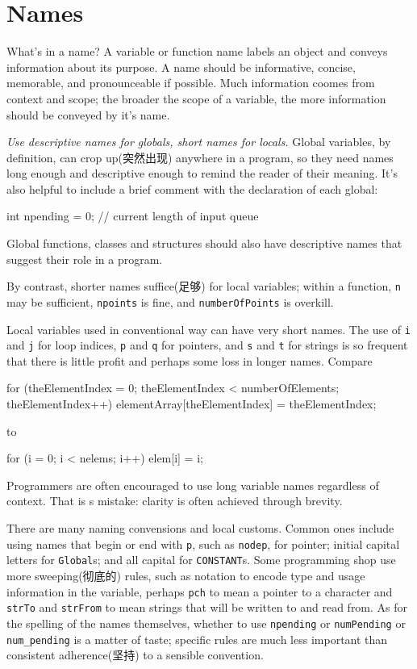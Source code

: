 \section{Names}
\label{sec:names}
What's in a name? A variable or function name labels an object and conveys
information about its purpose. A name should be informative, concise,
memorable, and pronounceable if possible. Much information coomes from
context and scope; the broader the scope of a variable, the more
information should be conveyed by it's name.

\emph{Use descriptive names for globals, short names for locals.} Global
variables, by definition, can crop up(突然出现) anywhere in a program, so
they need names long enough and descriptive enough to remind the reader of
their meaning. It's also helpful to include a brief comment with the
declaration of each global:
\begin{wellcode}
    int npending = 0;   // current length of input queue
\end{wellcode}
Global functions, classes and structures should also have descriptive names
that suggest their role in a program.

By contrast, shorter names suffice(足够) for local variables; within a
function, \verb"n" may be sufficient, \verb"npoints" is fine, and
\verb"numberOfPoints" is overkill.

Local variables used in conventional way can have very short names. The use
of \verb"i" and \verb"j" for loop indices, \verb"p" and \verb"q" for
pointers, and \verb"s" and \verb"t" for strings is so frequent that there
is little profit and perhaps some loss in longer names. Compare
\begin{badcode}
    for (theElementIndex = 0; theElementIndex < numberOfElements;
            theElementIndex++)
        elementArray[theElementIndex] = theElementIndex;
\end{badcode}
to 
\begin{wellcode}
    for (i = 0; i < nelems; i++)
        elem[i] = i;
\end{wellcode}
Programmers are often encouraged to use long variable names regardless of
context. That is s mistake: clarity is often achieved through brevity.

There are many naming convensions and local customs. Common ones include
using names that begin or end with \verb"p", such as \verb"nodep", for
pointer; initial capital letters for \verb"Global"s; and all capital for
\verb"CONSTANT"s. Some programming shop use more sweeping(彻底的) rules,
such as notation to encode type and usage information in the variable,
perhaps \verb"pch" to mean a pointer to a character and \verb"strTo" and
\verb"strFrom" to mean strings that will be written to and read from. As
for the spelling of the names themselves, whether to use \verb"npending" or
\verb"numPending" or \verb"num_pending" is a matter of taste; specific
rules are much less important than consistent adherence(坚持) to a sensible
convention.

